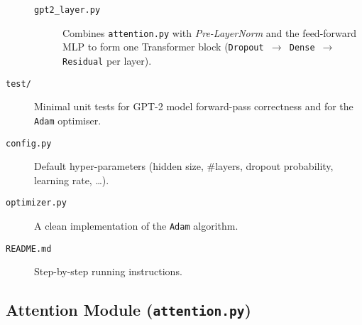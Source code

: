 \documentclass{article}
\theoremstyle{definition}
\begin{document}
\begin{description}
\begin{description}
              \item[\texttt{gpt2\_layer.py}]%
                     Combines \texttt{attention.py} with
                     \emph{Pre-LayerNorm} and the feed-forward MLP to
                     form one Transformer block
                     (\texttt{Dropout $\rightarrow$ Dense $\rightarrow$
                     Residual} per layer).
          \end{description}
  
    \item[\texttt{test/}]%
          Minimal unit tests for GPT-2 model forward-pass correctness and for the
          \texttt{Adam} optimiser.
  
    \item[\texttt{config.py}]%
          Default hyper-parameters (hidden size, \#layers, dropout
          probability, learning rate, \dots).
  
    \item[\texttt{optimizer.py}]%
          A clean implementation of the \texttt{Adam} algorithm.
    \item[\texttt{README.md}]%
          Step-by-step running instructions.
  \end{description}

  \subsection{Attention Module (\texttt{attention.py})}
\end{document}
